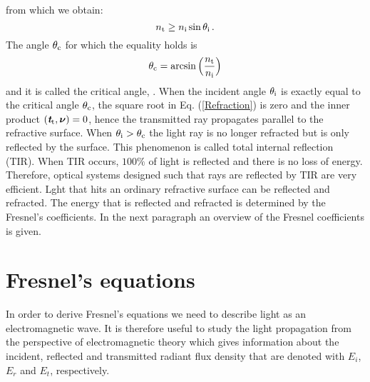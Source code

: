 from which we obtain:
\begin{equation}
 n_\textrm{t}\geq n_\textrm{i} \sin\theta_\textrm{i}\,.
\end{equation}
 The angle $\theta_{\textrm{c}}$ for which the equality holds is
\begin{equation}\label{critical}
\theta_{\textrm{c}} = \arcsin\Big(\frac{n_\textrm{t}}{n_\textrm{i}}\Big)
\end{equation} and it is called the critical angle, \cite{chaves2015introduction}.
When the incident angle $\theta_{\textrm{i}}$ is exactly equal to the critical angle $\theta_{\textrm{c}}$, the square root in Eq. (\ref{Refraction}) is zero and the inner product $(\textit{\textbf{t}}_\textrm{t},\boldsymbol{\nu})=0$, hence the transmitted ray propagates parallel to the refractive surface. 
When $\theta_{\textrm{i}}>\theta_{\textrm{c}}$ the light ray is no longer refracted but is only reflected by the surface. This phenomenon is called total internal reflection (TIR). When TIR occurs, $100\%$ of light is reflected and there is no loss of energy. Therefore, optical systems designed such that rays are reflected by TIR are very efficient. Lght that hits an ordinary refractive surface can be reflected and refracted. The energy that is reflected and refracted is determined by the Fresnel's coefficients.
In the next paragraph an overview of the Fresnel coefficients is given.
\section{Fresnel's equations}\label{sec:fresnel}
In order to derive Fresnel's equations we need to describe light as an electromagnetic wave. 
It is therefore useful to study the light propagation from the perspective of electromagnetic theory which gives information about the incident, reflected and transmitted radiant flux density that are denoted with $E_i$, $E_r$ and $E_t$, respectively.  

